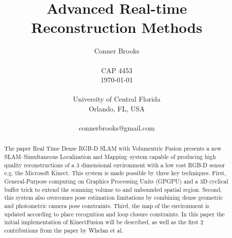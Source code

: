 \documentclass[10pt, twocolumn]{article}
\begin{document}
\title{Advanced Real-time Reconstruction Methods}

\author{Conner Brooks\\
\\
CAP 4453\\
\today \\
\\
University of Central Florida\\
Orlando, FL, USA\\
\\
connerbrooks@gmail.com\\
}

\maketitle
\thispagestyle{empty}


\begin{abstract}
The paper Real Time Dense RGB-D SLAM with Volumentric Fusion \cite{whelan14} presents a new SLAM--Simultaneous Localization and Mapping--system capable of producing high quality
reconstructions of a 3 dimensional environment with a low cost RGB-D sensor e.g. the Microsoft Kinect. This system is made possible by three key techniques.
First, General-Purpose computing on Graphics Processing Units (GPGPU) and a 3D 
  cyclical buffer trick to extend the scanning volume to and unbounded spatial
  region. Second, this system also overcomes pose estimation limitations by combining
  dense geometric and photometric camera pose constraints. Third, the map of the 
  environment is updated according to place recognition and loop closure constraints.
  In this paper the initial implementation of KinectFusion \cite{izadi11} \cite{newcombe11} will be described, as well as the first 2 contributions from the paper by Whelan et al.
  
\end{abstract}
\end{document}
